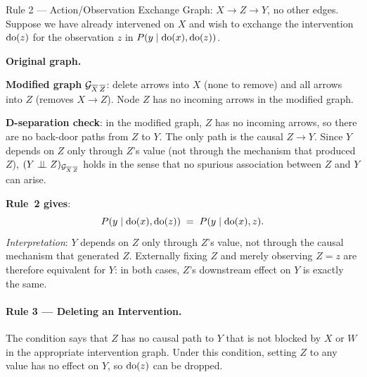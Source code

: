 \documentclass[master.tex]{subfiles}
\begin{document}
\begin{example}{Rule 2 --- Action/Observation Exchange}
\label{w3:ex:rule2}
Graph: $X \to Z \to Y$, no other edges.  Suppose we have already intervened
on $X$ and wish to exchange the intervention $\mathrm{do}(z)$ for the observation
$z$ in $P(y \mid \mathrm{do}(x), \mathrm{do}(z))$.

\medskip
\noindent\textbf{Original graph.}
\begin{center}
\end{center}

\noindent\textbf{Modified graph} $\mathcal{G}_{\overline{X}\,\overline{Z}}$:
delete arrows into $X$ (none to remove) and all arrows into $Z$ (removes
$X \to Z$).  Node $Z$ has no incoming arrows in the modified graph.

\begin{center}
\end{center}

\noindent\textbf{D-separation check}: in the modified graph, $Z$ has
no incoming arrows, so there are no back-door paths from $Z$ to $Y$.
The only path is the causal $Z \to Y$.  Since $Y$ depends on $Z$ only
through $Z$'s value (not through the mechanism that produced $Z$),
$(Y \perp\!\!\!\perp Z)_{\mathcal{G}_{\overline{X}\,\overline{Z}}}$ holds in the sense
that no spurious association between $Z$ and $Y$ can arise. \checkmark

\noindent\textbf{Rule~2 gives}:
\[
  P(y \mid \mathrm{do}(x), \mathrm{do}(z)) \;=\; P(y \mid \mathrm{do}(x), z).
\]
\textit{Interpretation}: $Y$ depends on $Z$ only through $Z$'s value, not
through the causal mechanism that generated $Z$.  Externally fixing $Z$
and merely observing $Z{=}z$ are therefore equivalent for $Y$: in both
cases, $Z$'s downstream effect on $Y$ is exactly the same.
\end{example}

\paragraph{Rule 3 --- Deleting an Intervention.}
The condition says that $Z$ has no causal path to $Y$ that is not blocked by
$X$ or $W$ in the appropriate intervention graph.  Under this condition,
setting $Z$ to any value has no effect on $Y$, so $\mathrm{do}(z)$ can be dropped.
\end{document}
